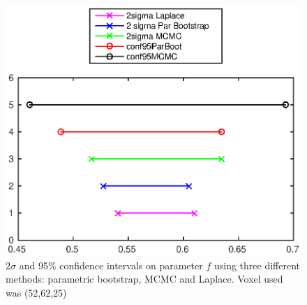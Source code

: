 \documentclass[11pt,a4paper,oneside]{report}
\begin{document}
\begin{figure}[H]
      \centering
    \includegraphics[scale=1]{figures/q2/q123-p3.eps}
    \caption{$2\sigma$ and 95\% confidence intervals on parameter $f$ using three different methods: parametric bootstrap, MCMC and Laplace. Voxel used was (52,62,25) }
    \label{q121-p3}
\end{figure}
\end{document}

